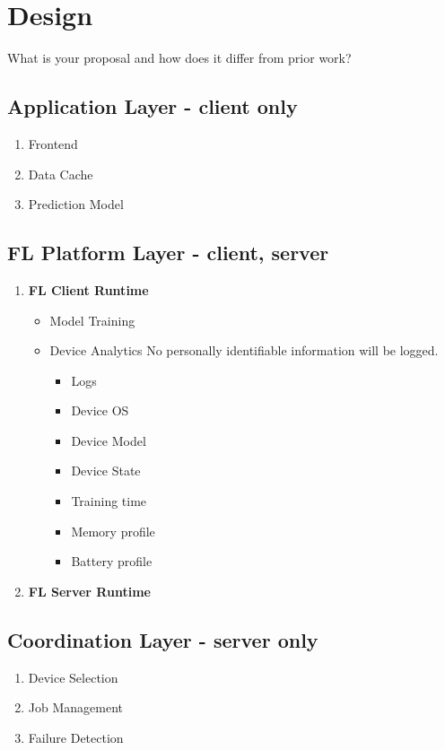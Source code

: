 \section{Design}
    What is your proposal and how does it differ from prior work?

    \subsection{Application Layer - client only}
        \begin{enumerate}
            \item Frontend
            \item Data Cache
            \item Prediction Model
        \end{enumerate}
    \subsection{FL Platform Layer - client, server}
        \begin{enumerate}
            \item \textbf{FL Client Runtime}
                \begin{itemize}
                    \item Model Training
                    \item Device Analytics \newline
                        No personally identifiable information will be logged.  
                        \begin{itemize}
                            \item Logs
                            \item Device OS
                            \item Device Model
                            \item Device State
                            \item Training time
                            \item Memory profile
                            \item Battery profile
                        \end{itemize}
                \end{itemize}
            \item \textbf{FL Server Runtime}

        \end{enumerate}
    \subsection{Coordination Layer - server only}
        \begin{enumerate}
            \item Device Selection
            \item Job Management
            \item Failure Detection
        \end{enumerate}